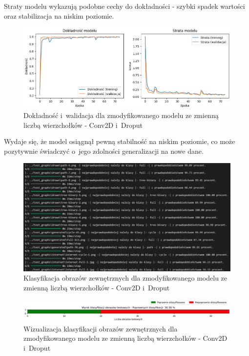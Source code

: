 Straty modelu wykazują podobne cechy do dokładności - szybki spadek wartości oraz stabilizacja na niskim poziomie.

\begin{figure}[ht]
	\centering
	\includegraphics[width=14cm]{resources/tests/images/v4/multiple_edges_1_img.png}
	\caption{Dokładność i~walidacja dla zmodyfikowanego modelu ze zmienną liczbą wierzchołków - Conv2D i~Droput}
	\label{Fig:tests-var-1a}
\end{figure}
\FloatBarrier

Wydaje się, że model osiągnął pewną stabilność na niskim poziomie, co może pozytywnie świadczyć o~jego zdolności generalizacji na nowe dane.

\begin{figure}[ht]
	\centering
	\includegraphics[width=14cm]{resources/tests/images/v4/multiple_edges_1_txt.png}
	\caption{Klasyfikacja obrazów zewnętrznych dla zmodyfikowanego modelu ze zmienną liczbą wierzchołków - Conv2D i~Droput}
	\label{Fig:tests-var-1b}
\end{figure}
\FloatBarrier

\begin{figure}[ht]
	\centering
	\includegraphics[width=14cm]{resources/tests/images/v4/multiple_edges_1_bar.png}
	\caption{Wizualizacja klasyfikacji obrazów zewnętrznych dla zmodyfikowanego modelu ze zmienną liczbą wierzchołków - Conv2D i~Droput}
	\label{Fig:tests-var-1c}
\end{figure}
\FloatBarrier

